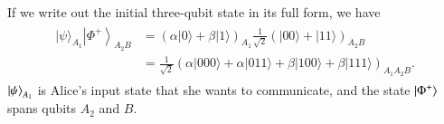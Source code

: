 If we write out the initial three-qubit state in its full form, we have
\begin{align}
    \begin{aligned}
|\psi\rangle_{A_{1}}\left|\Phi^{+}\right\rangle_{A_{2} B} &=(\alpha|0\rangle+\beta|1\rangle)_{A_{1}} \frac{1}{\sqrt{2}}(|00\rangle+|11\rangle)_{A_{2} B} \\
&=\frac{1}{\sqrt{2}}(\alpha|000\rangle+\alpha|011\rangle+\beta|100\rangle+\beta|111\rangle)_{A_{1} A_{2} B}.
\end{aligned}
\end{align}
$\left| \psi \right\rangle_{A_1}$ is Alice's input state that she wants to communicate, and the state $\left| \Phi^+ \right\rangle$ spans qubits $A_2$ and $B$.

